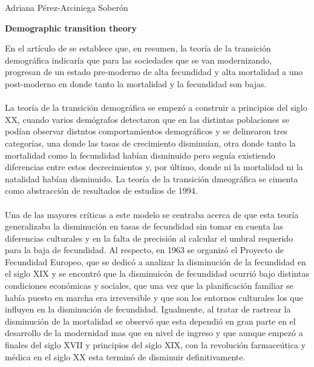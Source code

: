 \documentclass[11pt,spanish,letterpaper]{article}
\theoremstyle{plain}
\begin{document}
\begin{flushleft}
Adriana P\'erez-Arciniega Sober\'on
\end{flushleft}
\begin{center}
\textbf{Demographic transition theory}
\end{center}
En el art\'iculo de \cite{kirk1996demographic} se establece que, en resumen, la teor\'ia de la transici\'on demogr\'afica indicar\'ia que para las sociedades que se van modernizando, progresan de un estado pre-moderno de alta fecundidad y alta mortalidad a uno post-moderno en donde tanto la mortalidad y la fecundidad son bajas.\\
\\
La teor\'ia de la transici\'on demogr\'afica se empez\'o a construir a principios del siglo XX, cuando varios dem\'ografos detectaron que en las distintas poblaciones se pod\'ian observar distntos comportamientos demogr\'aficos y se delinearon tres categor\'ias, una donde las tasas de crecimiento disminu\'ian, otra donde tanto la mortalidad como la fecundidad hab\'ian disminuido pero segu\'ia existiendo diferencias entre estos decrecimientos y, por \'ultimo, donde ni la mortalidad ni la natalidad hab\'ian disminuido. La teor\'ia de la transici\'on dmeogr\'afica se cimenta como abstracci\'on de resultados de estudios de 1994.\\
\\
Una de las mayores cr\'iticas a este modelo se centraba acerca de que esta teor\'ia generalizaba la disminuci\'on en tasas de fecundidad sin tomar en cuenta las diferencias culturales y en la falta de precisi\'on al calcular el umbral requerido para la baja de fecundidad. Al respecto, en 1963 se organiz\'o el Proyecto de Fecundidad Europeo, que se dedic\'o a analizar la disminuci\'on de la fecundidad en el siglo XIX y se encontr\'o que la disminuic\'on de fecundidad ocurri\'o bajo distintas condiciones econ\'omicas y sociales, que una vez que la planificaci\'on familiar se hab\'ia puesto en marcha era irreversible y que son los entornos culturales los que influyen en la disminuci\'on de fecundidad. Igualmente, al tratar de rastrear la disminuci\'on de la mortalidad se observ\'o que esta dependi\'o en gran parte en el desarrollo de la modernidad mas que en nivel de ingreso y que aunque empez\'o a finales del siglo XVII y principios del siglo XIX, con la revoluci\'on farmace\'utica y m\'edica en el siglo XX  esta termin\'o de disminuir definitivamente.\\
\\
\end{document}
